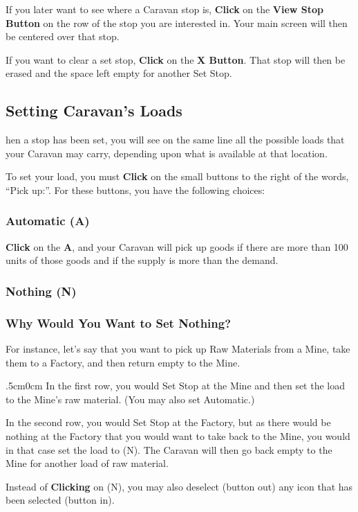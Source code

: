 
If you later want to see where a Caravan stop is, \textbf{Click} on the \textbf{View Stop Button} on the row of the stop you are interested in. Your main screen will then be centered over that stop.

If you want to clear a set stop, \textbf{Click} on the \textbf{X Button}. That stop will then be erased and the space left empty for another Set Stop.

\subsection{Setting Caravan’s Loads}


hen a stop has been set, you will see on the same line all the possible loads that your Caravan may carry, depending upon what is available at that location.

To set your load, you must \textbf{Click} on the small buttons to the right of the words, “Pick up:”. For these buttons, you have the following choices:

\subsubsection{{Automatic (A)}}

\textbf{Click} on the \textbf{A}, and your Caravan will pick up goods if there are more than 100 units of those goods and if the supply is more than the demand.

\subsubsection{Nothing (N)}

\subsubsection{Why Would You Want to Set Nothing?}

For instance, let’s say that you want to pick up Raw Materials from a Mine, take them to a Factory, and then return empty to the Mine.

\begin{changemargin}{.5cm}{0cm}
In the first row, you would Set Stop at the Mine and then set the load to the Mine’s raw material. (You may also set Automatic.)

In the second row, you would Set Stop at the Factory, but as there would be nothing at the Factory that you would want to take back to the Mine, you would in that case set the load to (N). The Caravan will then go back empty to the Mine for another load of raw material.

Instead of \textbf{Clicking} on (N), you may also deselect (button out) any icon that has been selected (button in).
\end{changemargin}

